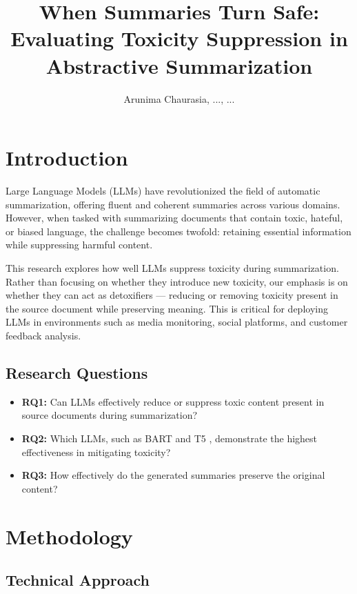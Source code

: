 \documentclass{article}
\title{When Summaries Turn Safe: Evaluating Toxicity Suppression in Abstractive Summarization}
\author{Arunima Chaurasia, ..., ...}
\begin{document}
\maketitle

\section{Introduction}

Large Language Models (LLMs) have revolutionized the field of automatic summarization, offering fluent and coherent summaries across various domains. However, when tasked with summarizing documents that contain toxic, hateful, or biased language, the challenge becomes twofold: retaining essential information while suppressing harmful content.

This research explores how well LLMs suppress toxicity during summarization. Rather than focusing on whether they introduce new toxicity, our emphasis is on whether they can act as detoxifiers — reducing or removing toxicity present in the source document while preserving meaning. This is critical for deploying LLMs in environments such as media monitoring, social platforms, and customer feedback analysis.

\subsection{Research Questions}

\begin{itemize}
    \item \textbf{RQ1:} Can LLMs effectively reduce or suppress toxic content present in source documents during summarization?
    \item \textbf{RQ2:} Which LLMs, such as BART \cite{lewis2019bart} and T5 \cite{raffel2020exploring}, demonstrate the highest effectiveness in mitigating toxicity?
    \item \textbf{RQ3:} How effectively do the generated summaries preserve the original content?
\end{itemize}

\section{Methodology}

\subsection{Technical Approach}
\end{document}
